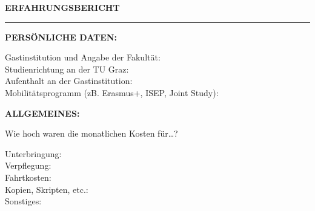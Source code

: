 \documentclass[12pt, a4paper]{article}
\newcommand{\heading}[1]{\bigskip\noindent\textbf{\MakeUppercase{#1}:}\medskip}
\newcommand{\blank}{\hrulefill}
\begin{document}
\let\oldindent\parindent
\setlength{\parindent}{0pt}
\setlength{\parskip}{\bigskipamount}

\vspace{-1.5cm}


\begin{centering}
  \large \textbf{ERFAHRUNGSBERICHT}
  \vspace{\baselineskip}
  \hrule
  \vspace{\baselineskip}
\end{centering}


\heading{Persönliche Daten}
\begin{description}
\item[Gastinstitution und Angabe der Fakultät:] \blank
\item[Studienrichtung an der TU Graz:]  \blank
\item[Aufenthalt an der Gastinstitution:]  \blank
\item[Mobilitätsprogramm (zB. Erasmus+, ISEP, Joint Study):]  \blank
\end{description}


\heading{Allgemeines}

Wie hoch waren die monatlichen Kosten für\ldots?

\begin{description}
\item[Unterbringung:]  \blank
\item[Verpflegung:] \blank
\item[Fahrtkosten:]  \blank
\item[Kopien, Skripten, etc.:]  \blank
\item[Sonstiges:]  \blank
\end{description}
\end{document}

